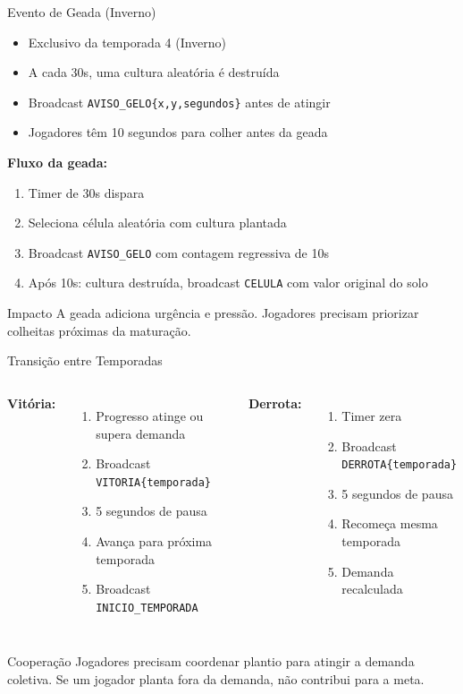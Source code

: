 \documentclass[aspectratio=169]{beamer}
\begin{document}
\begin{frame}{Evento de Geada (Inverno)}
  \begin{itemize}
    \item Exclusivo da temporada 4 (Inverno)
    \item A cada 30s, uma cultura aleat\'oria \'e destru\'ida
    \item Broadcast \texttt{AVISO\_GELO\{x,y,segundos\}} antes de atingir
    \item Jogadores t\^em 10 segundos para colher antes da geada
  \end{itemize}
  \vfill
  \textbf{Fluxo da geada:}
  \begin{enumerate}
    \item Timer de 30s dispara
    \item Seleciona c\'elula aleat\'oria com cultura plantada
    \item Broadcast \texttt{AVISO\_GELO} com contagem regressiva de 10s
    \item Ap\'os 10s: cultura destru\'ida, broadcast \texttt{CELULA} com valor original do solo
  \end{enumerate}
  \vfill
  \begin{alertblock}{Impacto}
    A geada adiciona urg\^encia e press\~ao. Jogadores precisam priorizar colheitas pr\'oximas da matura\c{c}\~ao.
  \end{alertblock}
\end{frame}

\begin{frame}{Transi\c{c}\~ao entre Temporadas}
  \begin{columns}
    \textbf{Vit\'oria:}
    \begin{enumerate}
      \item Progresso atinge ou supera demanda
      \item Broadcast \texttt{VITORIA\{temporada\}}
      \item 5 segundos de pausa
      \item Avan\c{c}a para pr\'oxima temporada
      \item Broadcast \texttt{INICIO\_TEMPORADA}
    \end{enumerate}
    \textbf{Derrota:}
    \begin{enumerate}
      \item Timer zera
      \item Broadcast \texttt{DERROTA\{temporada\}}
      \item 5 segundos de pausa
      \item Recome\c{c}a mesma temporada
      \item Demanda recalculada
    \end{enumerate}
  \end{columns}
  \vfill
  \begin{exampleblock}{Coopera\c{c}\~ao}
    Jogadores precisam coordenar plantio para atingir a demanda coletiva. Se um jogador planta fora da demanda, n\~ao contribui para a meta.
  \end{exampleblock}
\end{frame}
\end{document}
